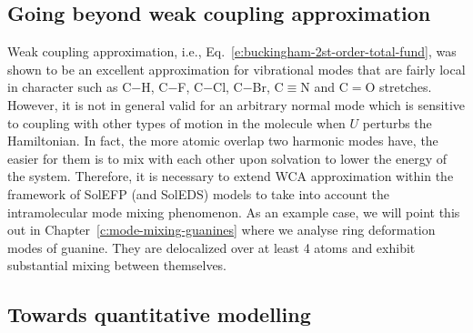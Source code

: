 \documentclass[a4paper,titlepage,twoside,fleqn,12pt]{book}
\begin{document}
\begin{refsection}
\section{Going beyond weak coupling approximation\label{s:beyond-wca}}

Weak coupling approximation, i.e., Eq.~\eqref{e:buckingham-2st-order-total-fund},
was shown to be an excellent approximation
for vibrational modes that are fairly local in character
such as C$-$H, C$-$F, C$-$Cl, C$-$Br, C$\equiv$N and C$=$O stretches. However, it
is not in general valid for an arbitrary normal mode
which is sensitive to coupling with other types of motion
in the molecule when $U$ perturbs the Hamiltonian.
In fact, the more atomic overlap two harmonic modes have,
the easier for them is to mix with each other
upon solvation to lower the energy
of the system. 
Therefore, it is necessary to extend WCA approximation
within the framework of SolEFP (and SolEDS) models
to take into account the intramolecular mode mixing
phenomenon. As an example case, we will point this out
in Chapter~\ref{c:mode-mixing-guanines} 
where we analyse ring deformation modes
of guanine. They are delocalized over at least 4 atoms
and exhibit substantial mixing between themselves.

\subsection{Towards quantitative modelling}


\end{refsection}
\end{document}
